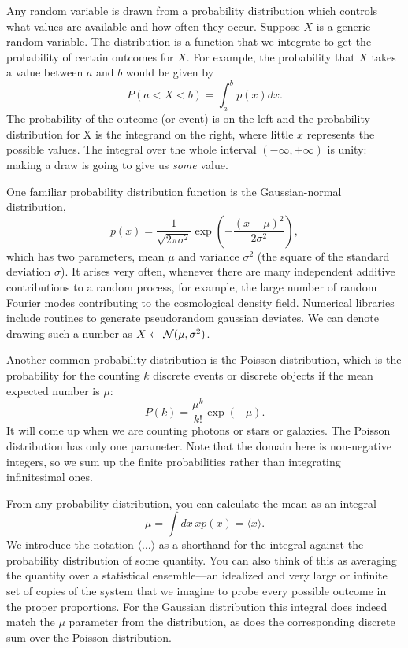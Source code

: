 Any random variable is drawn from a probability distribution which controls what values are available and how often they occur.  Suppose $X$ is a generic random variable.  The distribution is a function that we integrate to get the probability of certain outcomes for $X$.  For example, the probability that $X$ takes a value between $a$ and $b$ would be given by
\begin{equation}
  P(a<X<b) = \int_a^b p(x) dx.
\end{equation}
The probability of the outcome (or event) is on the left and the probability distribution for X is the integrand on the right, where little $x$ represents the possible values.  The integral over the whole interval $(-\infty, +\infty)$ is unity: making a draw is going to give us \textit{some} value.

One familiar probability distribution function is the Gaussian-normal distribution,
\begin{equation}
  p(x) = \frac{1}{\sqrt{2\pi \sigma^2}} \exp \left( -\frac{(x-\mu)^2}{2\sigma^2}   \right),
\end{equation}
which has two parameters, mean $\mu$ and variance $\sigma^2$ (the square of the standard deviation $\sigma$).  It arises very often, whenever there are many independent additive contributions to a random process, for example, the large number of random Fourier modes contributing to the cosmological density field.  Numerical libraries include routines to generate pseudorandom gaussian deviates.  We can denote drawing such a number as $X \leftarrow {\cal N}(\mu,\sigma^2)$.

Another common probability distribution is the Poisson distribution, which is the probability for the counting $k$ discrete events or discrete objects if the mean expected number is $\mu$:
\begin{equation}
  P(k) = \frac{\mu^k}{k!}\exp(-\mu).
\end{equation}
It will come up when we are counting photons or stars or galaxies.  The Poisson distribution has only one parameter.  Note that the domain here is non-negative integers, so we sum up the finite probabilities rather than integrating infinitesimal ones.

From any probability distribution, you can calculate the mean as an integral
\begin{equation}
  \mu = \int dx\,  x  p(x) = \langle x \rangle.
\end{equation}
We introduce the notation $\langle \dots \rangle$ as a shorthand for the integral against the probability distribution of some quantity.  You can also think of this as averaging the quantity over a statistical ensemble---an idealized and very large or infinite set of copies of the system that we imagine to probe every possible outcome in the proper proportions.  For the Gaussian distribution this integral does indeed match the $\mu$ parameter from the distribution, as does the corresponding discrete sum over the Poisson distribution.

